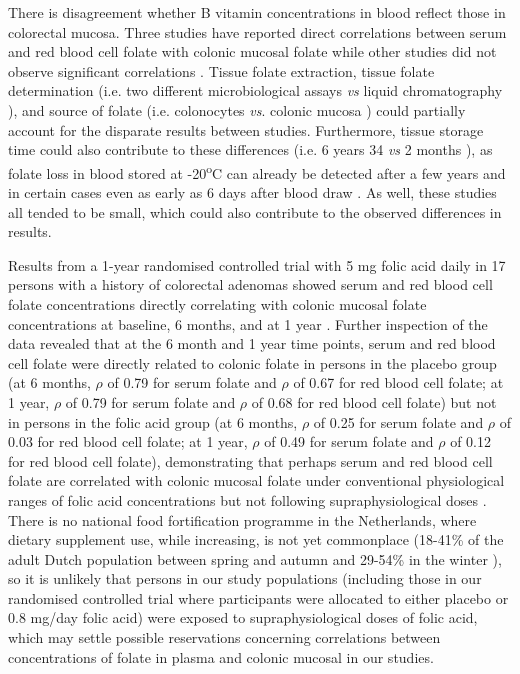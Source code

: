 \noindent There is disagreement whether B vitamin concentrations in blood reflect those in colorectal mucosa. Three studies have reported direct correlations between serum and red blood cell folate with colonic mucosal folate \cite{c735,c736,c737} while other studies did not observe significant correlations \cite{c734,c738,c739}. Tissue folate extraction, tissue folate determination (i.e. two different microbiological assays \cite{c736,c739} \emph{vs} liquid chromatography \cite{c734}), and source of folate (i.e. colonocytes \cite{c738,c739} \emph{vs}. colonic mucosa \cite{c734,c735,c736}) could partially account for the disparate results between studies. Furthermore, tissue storage time could also contribute to these differences (i.e. 6 years 34 \emph{vs} 2 months \cite{c736}), as folate loss in blood stored at -20\textsuperscript{o}C can already be detected after a few years \cite{c740,c741} and in certain cases even as early as 6 days after blood draw \cite{c742}. As well, these studies all tended to be small, which could also contribute to the observed differences in results.

\noindent Results from a 1-year randomised controlled trial with 5 mg folic acid daily in 17 persons with a history of colorectal adenomas showed serum and red blood cell folate concentrations directly correlating with colonic mucosal folate concentrations at baseline, 6 months, and at 1 year \cite{c735}. Further inspection of the data revealed that at the 6 month and 1 year time points, serum and red blood cell folate were directly related to colonic folate in persons in the placebo group (at 6 months, $\rho$ of 0.79 for serum folate and $\rho$ of 0.67 for red blood cell folate; at 1 year, $\rho$ of 0.79 for serum folate and $\rho$ of 0.68 for red blood cell folate) but not in persons in the folic acid group (at 6 months, $\rho$ of 0.25 for serum folate and $\rho$ of 0.03 for red blood cell folate; at 1 year, $\rho$ of 0.49 for serum folate and $\rho$ of 0.12 for red blood cell folate), demonstrating that perhaps serum and red blood cell folate are correlated with colonic mucosal folate under conventional physiological ranges of folic acid concentrations but not following supraphysiological doses \cite{c735}. There is no national food fortification programme in the Netherlands, where dietary supplement use, while increasing, is not yet commonplace (18-41\% of the adult Dutch population between spring and autumn and 29-54\% in the winter \cite{c720}), so it is unlikely that persons in our study populations (including those in our randomised controlled trial where participants were allocated to either placebo or 0.8 mg/day folic acid) were exposed to supraphysiological doses of folic acid, which may settle possible reservations concerning correlations between concentrations of folate in plasma and colonic mucosal in our studies.

